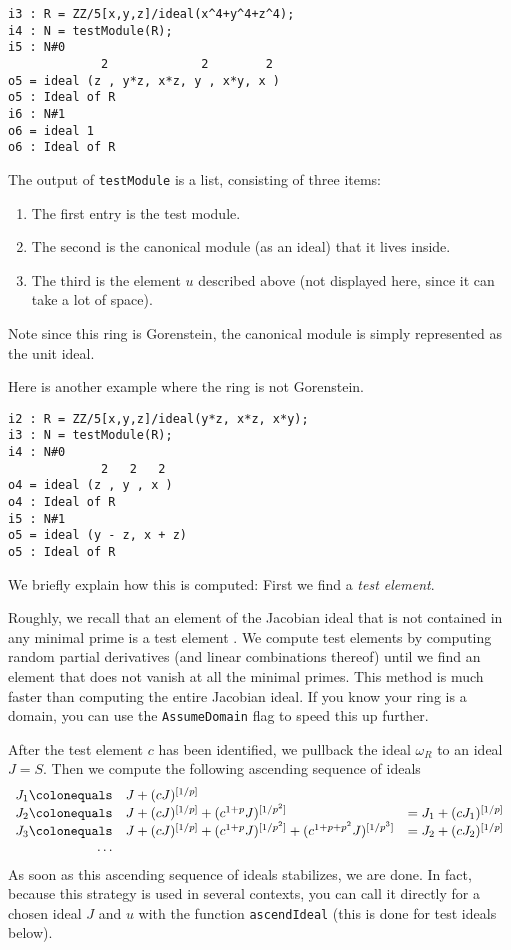 \documentclass{amsart}
\begin{document}
\medskip
\begin{verbatim}
i3 : R = ZZ/5[x,y,z]/ideal(x^4+y^4+z^4);
i4 : N = testModule(R);
i5 : N#0
             2             2        2
o5 = ideal (z , y*z, x*z, y , x*y, x )
o5 : Ideal of R
i6 : N#1
o6 = ideal 1
o6 : Ideal of R
\end{verbatim}
\medskip

The output of \texttt{testModule} is a list, consisting of three items:
\begin{enumerate}
\item The first entry is the test module.
\item The second is the canonical module (as an ideal) that it lives inside.  
\item The third is the element $u$ described above (not displayed here, since it can take a lot of space).  
\end{enumerate}
Note since this ring is Gorenstein, the canonical module is simply represented as the unit ideal.

Here is another example where the ring is not Gorenstein.

\medskip
\begin{verbatim}
i2 : R = ZZ/5[x,y,z]/ideal(y*z, x*z, x*y);
i3 : N = testModule(R);
i4 : N#0
             2   2   2
o4 = ideal (z , y , x )
o4 : Ideal of R
i5 : N#1
o5 = ideal (y - z, x + z)
o5 : Ideal of R
\end{verbatim}
\medskip

We briefly explain how this is computed:  First we find a \emph{test element}.
\begin{remark}
\label{rem.ComputationOfTestElements}
Roughly, we recall that an element of the Jacobian ideal that is not contained in any minimal prime is a test element \cite{HochsterFoundations}.  We compute test elements by computing random partial derivatives (and linear combinations thereof) until we find an element that does not vanish at all the minimal primes.  This method is much faster than computing the entire Jacobian ideal.  If you know your ring is a domain, you can use the \texttt{AssumeDomain} flag to speed this up further.
\end{remark}

After the test element $c$ has been identified, we pullback the ideal $\omega_R$ to an ideal $J = S$.  Then we compute the following ascending sequence of ideals
\begin{equation}
\label{eq.AscendIdealExplanation}
\begin{array}{rll}
J_1 \colonequals &  J + (c J)^{[1/p]} & \\
J_2 \colonequals & J + (c J)^{[1/p]} + (c^{1+p} J)^{[1/p^2]} & = J_1 + (c J_1)^{[1/p]}\\
J_3 \colonequals & J + (c J)^{[1/p]} + (c^{1+p} J)^{[1/p^2]} + (c^{1+p+p^2} J)^{[1/p^3]} & =  J_2 + (cJ_2)^{[1/p]}\\
\dots
\end{array}
\end{equation}
As soon as this ascending sequence of ideals stabilizes, we are done.
In fact, because this strategy is used in several contexts, you can call it directly for a chosen ideal $J$ and $u$ with the function \texttt{ascendIdeal} (this is done for test ideals below).
\end{document}
